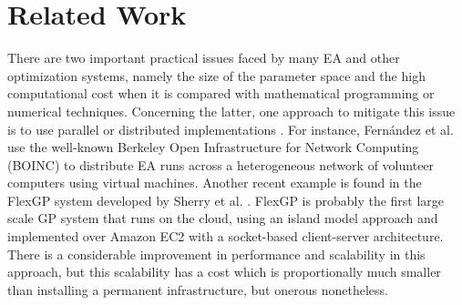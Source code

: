 \section{Related Work}
\label{sec:work}
There are two important practical issues faced by many EA and other
optimization systems, namely the size of the parameter 
space and the high computational cost when it is compared with
mathematical programming or numerical techniques. %
Concerning the latter, one approach to mitigate this issue is to use parallel or 
distributed implementations \cite{cantu-paz:migration-policies,duda2013gpu}.
For instance, Fern\'andez et al. \cite{nc} %
use the well-known Berkeley Open Infrastructure for Network Computing (BOINC) to distribute EA runs across a
heterogeneous network of volunteer computers using virtual machines. Another recent example is 
found in the FlexGP system developed by Sherry et al. \cite{sherry2012flex}. FlexGP is probably the first large scale GP system 
that runs on the cloud, using an island model approach and implemented over Amazon EC2 with a 
socket-based client-server architecture. There is a considerable
improvement in performance and scalability in this approach, but this scalability has
a cost which is proportionally much smaller than installing a
permanent infrastructure, but onerous nonetheless. %

